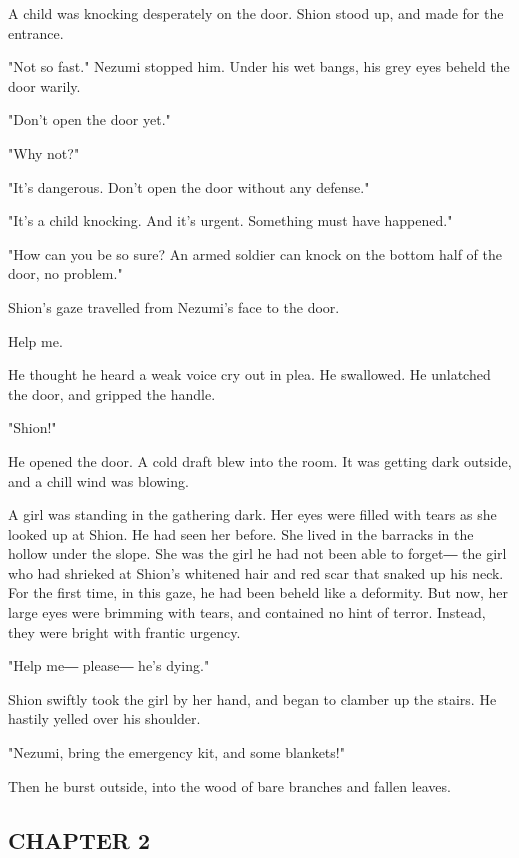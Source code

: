 A child was knocking desperately on the door. Shion stood up, and made
for the entrance.

"Not so fast." Nezumi stopped him. Under his wet bangs, his grey eyes
beheld the door warily.

"Don't open the door yet."

"Why not?"

"It's dangerous. Don't open the door without any defense."

"It's a child knocking. And it's urgent. Something must have happened."

"How can you be so sure? An armed soldier can knock on the bottom half
of the door, no problem."

Shion's gaze travelled from Nezumi's face to the door.

Help me.

He thought he heard a weak voice cry out in plea. He swallowed. He
unlatched the door, and gripped the handle.

"Shion!"

He opened the door. A cold draft blew into the room. It was getting dark
outside, and a chill wind was blowing.

A girl was standing in the gathering dark. Her eyes were filled with
tears as she looked up at Shion. He had seen her before. She lived in
the barracks in the hollow under the slope. She was the girl he had not
been able to forget― the girl who had shrieked at Shion's whitened hair
and red scar that snaked up his neck. For the first time, in this gaze,
he had been beheld like a deformity. But now, her large eyes were
brimming with tears, and contained no hint of terror. Instead, they were
bright with frantic urgency.~

"Help me― please― he's dying."

Shion swiftly took the girl by her hand, and began to clamber up the
stairs. He hastily yelled over his shoulder.

"Nezumi, bring the emergency kit, and some blankets!"

Then he burst outside, into the wood of bare branches and fallen leaves.

\hypertarget{index_split_001.htmlux5cux23calibre_pb_21}{}

\protect\hypertarget{index_split_021.html}{}{}

\hypertarget{index_split_021.htmlux5cux23calibre_pb_0}{}

\hypertarget{index_split_021.htmlux5cux23calibre_toc_3}{%
\subsection{CHAPTER 2}\label{index_split_021.htmlux5cux23calibre_toc_3}}

